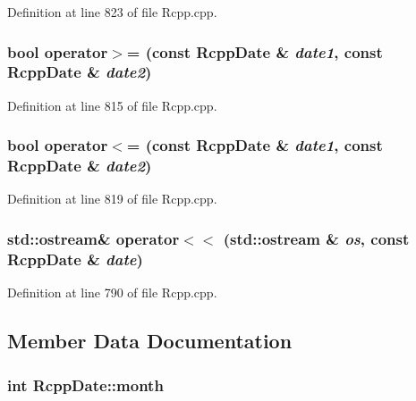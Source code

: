Definition at line 823 of file Rcpp.cpp.\hypertarget{classRcppDate_f7a217e1f5d4a91e2d86fc4da858a6c2}{
\subsubsection[operator$>$=]{\setlength{\rightskip}{0pt plus 5cm}bool operator$>$= (const {\bf RcppDate} \& {\em date1}, \/  const {\bf RcppDate} \& {\em date2})}}
\label{classRcppDate_f7a217e1f5d4a91e2d86fc4da858a6c2}




Definition at line 815 of file Rcpp.cpp.\hypertarget{classRcppDate_594132f5ef49b4f477d32289ced4df83}{
\subsubsection[operator$<$=]{\setlength{\rightskip}{0pt plus 5cm}bool operator$<$= (const {\bf RcppDate} \& {\em date1}, \/  const {\bf RcppDate} \& {\em date2})}}
\label{classRcppDate_594132f5ef49b4f477d32289ced4df83}




Definition at line 819 of file Rcpp.cpp.\hypertarget{classRcppDate_62c075d47528a48e5fb57c1855c4d71c}{
\subsubsection[operator$<$$<$]{\setlength{\rightskip}{0pt plus 5cm}std::ostream\& operator$<$$<$ (std::ostream \& {\em os}, \/  const {\bf RcppDate} \& {\em date})}}
\label{classRcppDate_62c075d47528a48e5fb57c1855c4d71c}




Definition at line 790 of file Rcpp.cpp.

\subsection{Member Data Documentation}
\hypertarget{classRcppDate_00bf3ece7320d63aee4f6b6df82b4f63}{
\subsubsection[month]{\setlength{\rightskip}{0pt plus 5cm}int {\bf RcppDate::month}}}
\label{classRcppDate_00bf3ece7320d63aee4f6b6df82b4f63}




